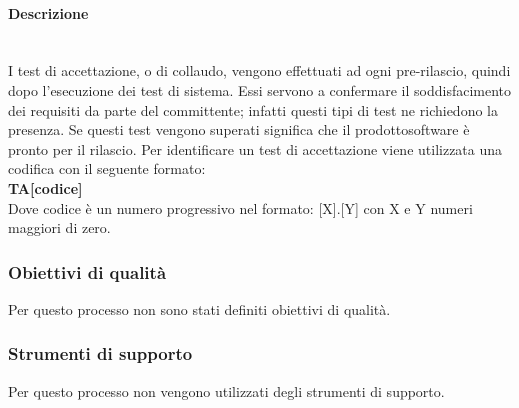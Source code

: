 			\paragraph*{Descrizione} \mbox{}\\ [1mm]
			I test di accettazione, o di collaudo, vengono effettuati ad ogni pre-rilascio, quindi dopo l'esecuzione dei test di sistema. Essi servono a confermare il soddisfacimento dei requisiti da parte del committente; infatti questi tipi di test ne richiedono la presenza. Se questi test vengono superati significa che il prodotto\glosp software è pronto per il rilascio. 
			Per identificare un test di accettazione viene utilizzata una codifica con il seguente formato:\\
			\textbf{TA[codice]} \\
			Dove codice è un numero progressivo nel formato: [X].[Y] con X e Y numeri maggiori di zero.
	\subsubsection{Obiettivi di qualità}
		Per questo processo non sono stati definiti obiettivi di qualità.
	\subsubsection{Strumenti di supporto}
		Per questo processo non vengono utilizzati degli strumenti di supporto.
